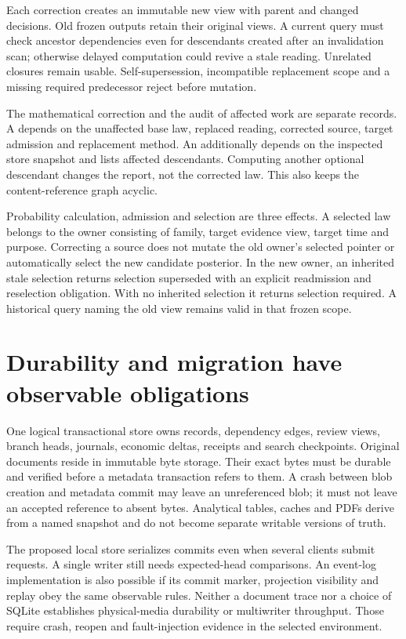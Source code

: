 Each correction creates an immutable new view with parent and changed decisions.
Old frozen outputs retain their original views. A current query must check
ancestor dependencies even for descendants created after an invalidation scan;
otherwise delayed computation could revive a stale reading. Unrelated closures
remain usable. Self-supersession, incompatible replacement scope and a missing
required predecessor reject before mutation.

The mathematical correction and the audit of affected work are separate records.
A  depends on the unaffected base law, replaced reading,
corrected source, target admission and replacement method. An
 additionally depends on the inspected store snapshot
and lists affected descendants. Computing another optional descendant changes
the report, not the corrected law. This also keeps the content-reference graph
acyclic.

Probability calculation, admission and selection are three effects. A selected
law belongs to the owner consisting of family, target evidence view, target time
and purpose. Correcting a source does not mutate the old owner's selected
pointer or automatically select the new candidate posterior. In the new owner,
an inherited stale selection returns selection superseded with an explicit
readmission and reselection obligation. With no inherited selection it returns
selection required. A historical query naming the old view remains valid in
that frozen scope.

\section{Durability and migration have observable obligations}

One logical transactional store owns records, dependency edges, review views,
branch heads, journals, economic deltas, receipts and search checkpoints.
Original documents reside in immutable byte storage. Their exact bytes must
be durable and verified before a metadata transaction refers to them. A crash
between blob creation and metadata commit may leave an unreferenced blob; it
must not leave an accepted reference to absent bytes. Analytical tables, caches
and PDFs derive from a named snapshot and do not become separate writable
versions of truth.

The proposed local store serializes commits even when several clients submit
requests. A single writer still needs expected-head comparisons. An event-log
implementation is also possible if its commit marker, projection visibility and
replay obey the same observable rules. Neither a document trace nor a choice
of SQLite establishes physical-media durability or multiwriter throughput.
Those require crash, reopen and fault-injection evidence in the selected
environment.

